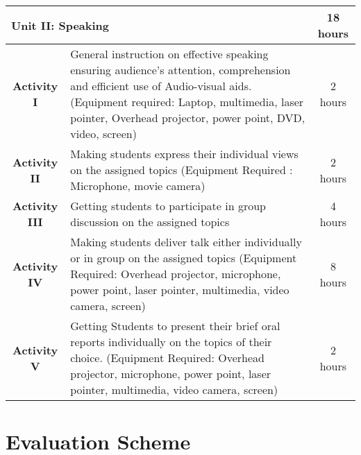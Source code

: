 \begin{table}[h]
\begin{tabular}{|c|m{30em}|c|}
    \hline
    \multicolumn{2}{|l|}{\textbf{Unit II: Speaking}} & 18 hours \\
    \hline
    \textbf{Activity I} & General instruction on effective speaking ensuring audience's attention, comprehension and efficient use of Audio-visual aids. (Equipment required: Laptop, multimedia, laser pointer, Overhead projector, power point, DVD, video, screen) & 2 hours \\
    \hline
    \textbf{Activity II} & Making students express their individual views on the assigned topics (Equipment Required : Microphone, movie camera) & 2 hours \\
    \hline
    \textbf{Activity III} & Getting students to participate in group discussion on the assigned topics & 4 hours \\
    \hline
    \textbf{Activity IV} & Making students deliver talk either individually or in group on the assigned topics (Equipment Required: Overhead projector, microphone, power point, laser pointer, multimedia, video camera, screen) & 8 hours \\
    \hline
    \textbf{Activity V} & Getting Students to present their brief oral reports individually on the topics of their choice. (Equipment Required: Overhead projector, microphone, power point, laser pointer, multimedia, video camera, screen) & 2 hours \\
    \hline
    \end{tabular}
 
   
\end{table}
\newpage

\section*{Evaluation Scheme}

